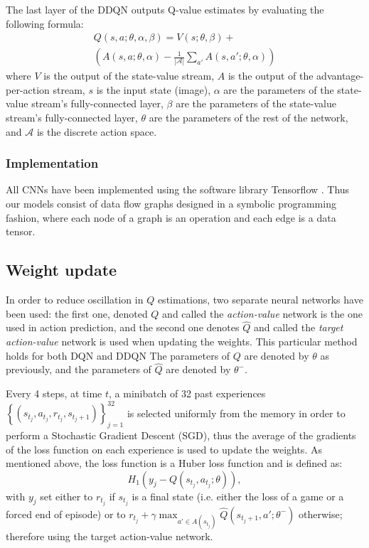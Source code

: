 \documentclass[letterpaper]{article}
\begin{document}
The last layer of the DDQN outputs Q-value estimates by evaluating the following formula:
\begin{multline}
    Q(s, a; \theta, \alpha, \beta) = V(s; \theta, \beta) + \\ \left(A(s, a; \theta, \alpha) - \frac{1}{|\mathcal{A}|} \sum_{a'} A(s, a'; \theta, \alpha)\right)
\end{multline}
where $V$ is the output of the state-value stream, $A$ is the output of the advantage-per-action stream, $s$ is the input state (image),
$\alpha$ are the parameters of the state-value stream's fully-connected layer, $\beta$ are the parameters of the state-value stream's
fully-connected layer, $\theta$ are the parameters of the rest of the network, and $\mathcal{A}$ is the discrete action space.

\subsubsection{Implementation}
All CNNs have been implemented using the software library Tensorflow \citep{tensorflow2015-whitepaper}.
Thus our models consist of data flow graphs designed in a symbolic programming fashion, where each node of a graph is an operation
and each edge is a data tensor.

\subsection{Weight update}

In order to reduce oscillation in $Q$ estimations, two separate neural networks have been used: the first one, denoted $Q$ and called the \textit{action-value}
network is the one used in action prediction, and the second one denotes $\hat Q$ and called the \textit{target action-value} network is used when
updating the weights. This particular method holds for both DQN and DDQN The parameters of $Q$ are denoted by $\theta$ as previously, and the parameters of
$\hat Q$ are denoted by $\theta^-$.

Every 4 steps, at time $t$, a minibatch of 32 past experiences $\left\{(s_{t_j}, a_{t_j}, r_{t_j}, s_{t_j+1})\right\}_{j=1}^{32}$ is selected uniformly from the
memory in order to perform a Stochastic Gradient Descent (SGD), thus the average of the gradients of the loss function on each experience is used to update
the weights. As mentioned above, the loss function is a Huber loss function and is defined as:
\begin{equation}
	H_1\left(y_j - Q(s_{t_j}, a_{t_j}; \theta)\right),
\end{equation}
with $y_j$ set either to $r_{t_j}$ if $s_{t_j}$ is a final state (i.e. either the loss of a game or a forced end of episode) or to
$r_{t_j} + \gamma\max_{a' \in A(s_{t_j})}\hat Q(s_{t_j+1}, a'; \theta^-)$ otherwise; therefore using the target action-value network.
\end{document}
